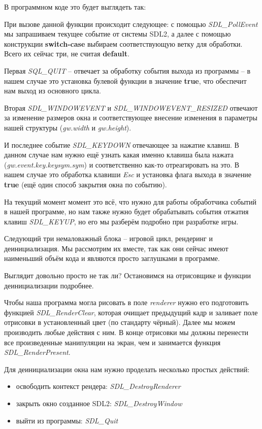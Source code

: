 В программном коде это будет выглядеть так:


При вызове данной функции происходит следующее: с помощью \emph{SDL\_PollEvent} мы запрашиваем текущее 
событие от системы SDL2, а далее с помощью конструкции \textbf{switch-case} выбираем соответствующую 
ветку для обработки. Всего их сейчас три, не считая \textbf{default}. 

Первая \emph{SQL\_QUIT} -- отвечает за обработку события выхода из программы -- в нашем случае это 
установка булевой функции в значение \textbf{true}, что обеспечит нам выход из основного цикла.

Вторая \emph{SDL\_WINDOWEVENT} и \emph{SDL\_WINDOWEVENT\_RESIZED} отвечают за изменение размеров 
окна и соответствующее внесение изменения в параметры нашей структуры (\emph{gw.width} и 
\emph{gw.height}).

И последнее событие \emph{SDL\_KEYDOWN} отвечающее за нажатие клавиш. В данном случае нам нужно 
ещё узнать какая именно клавиша была нажата (\emph{gw.event.key.keysym.sym}) и соответственно 
как-то отреагировать на это. В нашем случае это обработка клавиши \emph{Esc} и установка флага 
выхода в значение \textbf{true} (ещё один способ закрытия окна по событию).

На текущий момент момент это всё, что нужно для работы обработчика событий в нашей программе, но нам 
также нужно будет обрабатывать события отжатия клавиш \emph{SDL\_KEYUP}, но его мы разберём подробно 
при разработке игры.

Следующий три немаловажный блока -- игровой цикл, рендеринг и деинициализация. Мы рассмотрим их 
вместе, так как они сейчас имеют наименьший объём кода и являются просто заглушками в программе.


Выглядит довольно просто не так ли? Остановимся на отрисовщике и функции деинициализации подробнее.

Чтобы наша программа могла рисовать в поле \emph{renderer} нужно его подготовить функцией 
\emph{SDL\_RenderClear}, которая очищает предыдущий кадр и заливает поле отрисовки в установленный 
цвет (по стандарту чёрный). Далее мы можем производить любые действия с ним. В конце отрисовки мы 
должны перенести все произведенные манипуляции на экран, чем и занимается функция 
\emph{SDL\_RenderPresent}.

Для деинициализации окна нам нужно проделать несколько простых действий:
\begin{itemize}
    \item освободить контекст рендера: \emph{SDL\_DestroyRenderer}
    \item закрыть окно созданное SDL2: \emph{SDL\_DestroyWindow}
    \item выйти из программы: \emph{SDL\_Quit}
\end{itemize}

